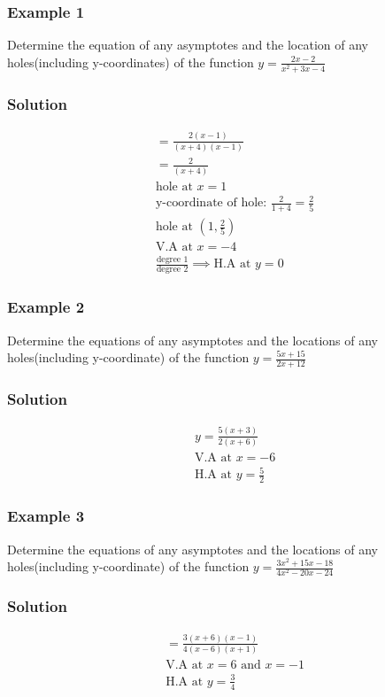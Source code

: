 \documentclass{article}
\begin{document}
\subsubsection{Example 1}
Determine the equation of any asymptotes and the location of any holes(including y-coordinates) of the function $y=\frac{2x-2}{x^2+3x-4}$
\subsubsection*{Solution}
\begin{align*}
    &=\frac{2(x-1)}{(x+4)(x-1)}\\
    &=\frac{2}{(x+4)}\\
    &\text{hole at } x=1\\
    &\text{y-coordinate of hole: } \frac{2}{1+4}=\frac{2}{5}\\
    &\text{hole at } \left(1, \frac{2}{5}\right)\\
    &\text{V.A at } x=-4\\
    &\frac{\text{degree 1}}{\text{degree 2}} \implies \text{H.A at } y=0
\end{align*}
\subsubsection{Example 2}
Determine the equations of any asymptotes and the locations of any holes(including y-coordinate) of the function $y=\frac{5x+15}{2x+12}$
\subsubsection*{Solution}
\begin{align*}
    &y=\frac{5(x+3)}{2(x+6)}\\
    & \text{V.A at } x=-6\\
    & \text{H.A at } y=\frac{5}{2}
\end{align*}
\subsubsection{Example 3}
Determine the equations of any asymptotes and the locations of any holes(including y-coordinate) of the function $y=\frac{3x^2+15x-18}{4x^2-20x-24}$
\subsubsection*{Solution}
\begin{align*}
    &=\frac{3(x+6)(x-1)}{4(x-6)(x+1)}\\
    &\text{V.A at } x=6 \text{ and } x=-1\\
    &\text{H.A at } y=\frac{3}{4}
\end{align*}
\end{document}

